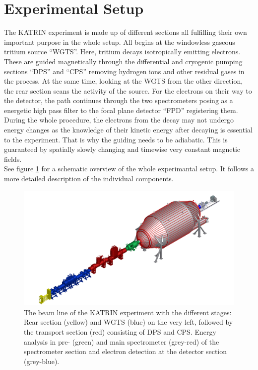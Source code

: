       \section{Experimental Setup}
      \label{ch:The KATRIN experiment:sec:Experimental setup}
      The KATRIN experiment is made up of different sections all fulfilling their own important purpose in the whole setup. All begins at the windowless gaseous tritium source ``WGTS''. Here, tritium decays isotropically emitting electrons. These are guided magnetically through the differential and cryogenic pumping sections ``DPS'' and ``CPS'' removing hydrogen ions and other residual gases in the process. At the same time, looking at the WGTS from the other direction, the rear section scans the activity of the source. For the electrons on their way to the detector, the path continues through the two spectrometers posing as a energetic high pass filter to the focal plane detector ``FPD'' registering them.\\
      During the whole procedure, the electrons from the decay may not undergo energy changes as the knowledge of their kinetic energy after decaying is essential to the experiment. That is why the guiding needs to be adiabatic. This is guaranteed by spatially slowly changing and timewise very constant magnetic fields.\\
      See figure \ref{fig:beamLine} for a schematic overview of the whole experimantal setup. It follows a more detailed description of the individual components.
      
      \begin{figure}
			
      		\includegraphics[width = \textwidth]{graphics/katrinExperiment/beamLineHD.jpg}

      	\caption[KATRIN beam line]{The beam line of the KATRIN experiment with the different stages: Rear section (yellow) and WGTS (blue) on the very left, followed by the transport section (red) consisting of DPS and CPS. Energy analysis in pre- (green) and main spectrometer (grey-red) of the spectrometer section and electron detection at the detector section (grey-blue).}
      	\label{fig:beamLine}
      \end{figure}


